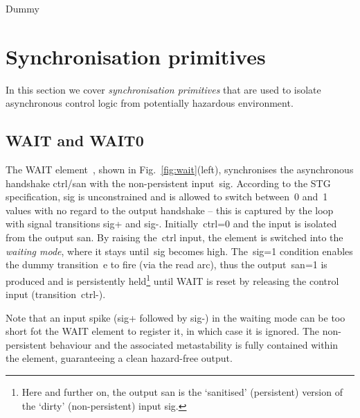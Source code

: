 \documentclass[conference]{IEEEtran}
\begin{document}
Dummy\\

\section{Synchronisation primitives}

In this section we cover \emph{synchronisation primitives} that are used to
isolate asynchronous control logic from potentially hazardous environment.

\subsection{\textsf{WAIT} and \textsf{WAIT0}}

The \textsf{WAIT} element~\cite{2015_sokolov_multiphase}, shown in Fig.~\ref{fig:wait}(left),
synchronises the asynchronous handshake \textsf{ctrl/san} with the non-persistent
input~\textsf{sig}. According to the STG specification, \textsf{sig} is unconstrained and
is allowed to switch between~0 and~1 values with no regard to the output handshake -- this
is captured by the loop with signal transitions \textsf{sig+} and \textsf{sig-}.
Initially~\textsf{ctrl=0} and the input is isolated from the output \textsf{san}.
By raising the~\textsf{ctrl} input, the element is switched into the \emph{waiting mode},
where it stays until~\textsf{sig} becomes high. The~\textsf{sig=1} condition enables the dummy
transition~\textsf{e} to fire (via the read arc), thus the output~\textsf{san=1} is produced
and is persistently held\footnote{Here and further on, the output \textsf{san}
is the `sanitised' (persistent) version of the `dirty' (non-persistent) input \textsf{sig}.}
until \textsf{WAIT} is reset by releasing the control input (transition~\textsf{ctrl-}).

Note that an input spike (\textsf{sig+} followed by \textsf{sig-}) in the waiting
mode can be too short fot the \textsf{WAIT} element to register it, in which case it is
ignored. The non-persistent behaviour and the associated metastability is fully contained
within the element, guaranteeing a clean hazard-free output.
\end{document}
